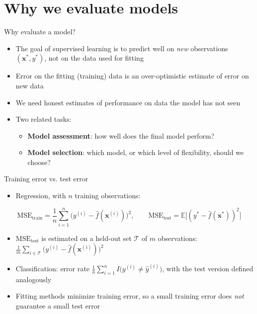 \section{Why we evaluate models}


\begin{frame}{Why evaluate a model?}
    \begin{itemize}
        \item The goal of supervised learning is to predict well on \emph{new} observations $(\mathbf{x}^\ast, y^\ast)$, not on the data used for fitting
        \item Error on the fitting (training) data is an over-optimistic estimate of error on new data
        \item We need honest estimates of performance on data the model has not seen
        \item Two related tasks:
        \begin{itemize}
            \item \textbf{Model assessment}: how well does the final model perform?
            \item \textbf{Model selection}: which model, or which level of flexibility, should we choose?
        \end{itemize}
    \end{itemize}
\end{frame}


\begin{frame}{Training error vs. test error}
    \begin{itemize}
        \item Regression, with $n$ training observations:
    \end{itemize}
    \[
        \mathrm{MSE}_{\text{train}} = \frac{1}{n}\sum_{i=1}^{n}\big(y^{(i)} - \hat{f}(\mathbf{x}^{(i)})\big)^2,
        \qquad
        \mathrm{MSE}_{\text{test}} = \mathbb{E}\big[(y^\ast - \hat{f}(\mathbf{x}^\ast))^2\big]
    \]
    \begin{itemize}
        \item $\mathrm{MSE}_{\text{test}}$ is estimated on a held-out set $\mathcal{T}$ of $m$ observations: $\frac{1}{m}\sum_{i\in\mathcal{T}}\big(y^{(i)} - \hat{f}(\mathbf{x}^{(i)})\big)^2$
        \item Classification: error rate $\frac{1}{n}\sum_{i=1}^{n} I\big(y^{(i)} \neq \hat{y}^{(i)}\big)$, with the test version defined analogously
        \item Fitting methods minimize training error, so a small training error does \emph{not} guarantee a small test error
    \end{itemize}
\end{frame}


